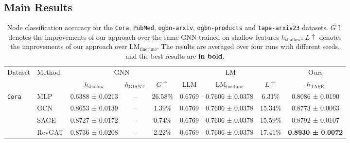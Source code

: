 \documentclass{article}
\begin{document}
\subsection{Main Results}

\begin{table}[!ht]
\caption{Node classification accuracy for the \texttt{Cora}, \texttt{PubMed}, \texttt{ogbn-arxiv}, \texttt{ogbn-products} and \texttt{tape-arxiv23} datasets. $G\uparrow$ denotes the improvements of our approach over the same GNN trained on shallow features $h_\textrm{shallow}$; $L\uparrow$ denotes the improvements of our approach over LM$_\textrm{finetune}$. The results are averaged over four runs with different seeds, and the best results are \textbf{in bold}.}
\tiny
    \label{tab: performance}
    \centering
\begin{tabular}{llccccccc}
\toprule
    \multirow{2}{*}{Dataset}     
    & \multirow{2}{*}{Method}
    & \multicolumn{3}{c}{GNN} 
    & \multicolumn{3}{c}{LM}
    & \multicolumn{1}{c}{Ours}\\
    \cmidrule(lr){3-5}\cmidrule(lr){6-8}\cmidrule(lr){9-9}
    &  
    &$h_{\textrm{shallow}}$
    & $h_{\textrm{GIANT}}$
    & $G\uparrow$
    & LLM 
    & LM$_{\textrm{finetune}}$ 
    & $L\uparrow$ 
    & $h_{\textrm{TAPE}}$ 
    \\
    \midrule
         \multirow{3}{*}{\texttt{Cora}} 
         & {MLP}
         & {0.6388 ± 0.0213}
         & {--}
         & 26.58\%
         & {0.6769}
         & {0.7606 ± 0.0378}
         & 6.31\%
         & 0.8086 ± 0.0190
         \\
         & GCN 
         & 0.8653 ± 0.0139
         & --
         & 1.39\%
         & 0.6769
         & 0.7606 ± 0.0378
         & 15.34\%
         & 0.8773 ± 0.0063
         \\
         & SAGE
         & 0.8727 ± 0.0172
         & --
         & 0.74\%
         & 0.6769
         & 0.7606 ± 0.0378
         & 15.59\%
         & 0.8792 ± 0.0107\\
         & RevGAT
         & 0.8736 ± 0.0208
         & --
         & 2.22\%
         & 0.6769
         & 0.7606 ± 0.0378
         & 17.41\%
         & \textbf{0.8930 ± 0.0072}
         

\end{tabular}
\end{table}
\end{document}
